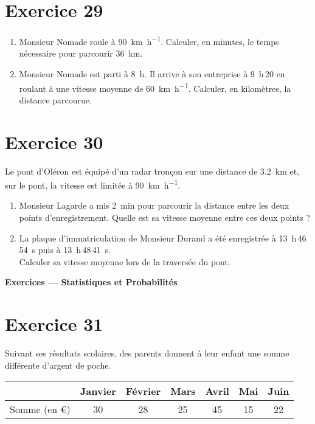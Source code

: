 \documentclass[a4paper,11pt]{article}
\begin{document}
\bigskip
\section*{Exercice 29}
\begin{enumerate}
  \item Monsieur Nomade roule à \SI{90}{\kilo\meter\per\hour}. Calculer, en minutes, le temps nécessaire pour parcourir \SI{36}{\kilo\meter}.
  \item Monsieur Nomade est parti à \SI{8}{h}. Il arrive à son entreprise à \SI{9}{h}\,20 en roulant à une vitesse moyenne de \SI{60}{\kilo\meter\per\hour}. Calculer, en kilomètres, la distance parcourue.
\end{enumerate}

\bigskip
\section*{Exercice 30}
Le pont d’Oléron est équipé d’un radar tronçon sur une distance de \SI{3,2}{\kilo\meter} et, sur le pont, la vitesse est limitée à \SI{90}{\kilo\meter\per\hour}.
\begin{enumerate}
  \item Monsieur Lagarde a mis \SI{2}{\minute} pour parcourir la distance entre les deux points d’enregistrement. Quelle est sa vitesse moyenne entre ces deux points ?
  \item La plaque d’immatriculation de Monsieur Durand a été enregistrée à \SI{13}{h}\,46\,\SI{54}{s} puis à \SI{13}{h}\,48\,\SI{41}{s}.\\
  Calculer sa vitesse moyenne lors de la traversée du pont.
\end{enumerate}


{\Large \textbf{Exercices — Statistiques et Probabilités}}\par\medskip

\bigskip
\section*{Exercice 31}
Suivant ses résultats scolaires, des parents donnent à leur enfant une somme différente d’argent de poche.
\medskip

\begin{tabular}{|c|cccccc|}
\hline
 & Janvier & Février & Mars & Avril & Mai & Juin\\
\hline
Somme (en \euro) & 30 & 28 & 25 & 45 & 15 & 22\\
\hline
\end{tabular}
\end{document}
